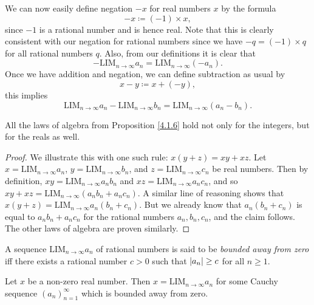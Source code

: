 \begin{note}
We can now easily define negation \(-x\) for real numbers \(x\) by the formula
\[
    -x \coloneqq (-1) \times x,
\]
since \(-1\) is a rational number and is hence real.
Note that this is clearly consistent with our negation for rational numbers since we have \(-q = (-1) \times q\) for all rational numbers \(q\).
Also, from our definitions it is clear that
\[
    -\text{LIM}_{n \to \infty} a_n = \text{LIM}_{n \to \infty} (-a_n).
\]
Once we have addition and negation, we can define subtraction as usual by
\[
    x - y \coloneqq x + (-y),
\]
this implies
\[
    \text{LIM}_{n \to \infty} a_n - \text{LIM}_{n \to \infty} b_n = \text{LIM}_{n \to \infty} (a_n - b_n).
\]
\end{note}

\begin{proposition}\label{5.3.11}
All the laws of algebra from Proposition \ref{4.1.6} hold not only for the integers, but for the reals as well.
\end{proposition}

\begin{proof}
We illustrate this with one such rule: \(x(y + z) = xy + xz\).
Let \(x = \text{LIM}_{n \to \infty} a_n\), \(y = \text{LIM}_{n \to \infty} b_n\), and \(z = \text{LIM}_{n \to \infty} c_n\) be real numbers.
Then by definition, \(xy = \text{LIM}_{n \to \infty} a_n b_n\) and \(xz = \text{LIM}_{n \to \infty} a_n c_n\), and so \(xy + xz = \text{LIM}_{n \to \infty} (a_n b_n + a_n c_n)\).
A similar line of reasoning shows that \(x(y + z) = \text{LIM}_{n \to \infty} a_n (b_n + c_n)\).
But we already know that \(a_n (b_n + c_n)\) is equal to \(a_n b_n + a_n c_n\) for the rational numbers \(a_n, b_n, c_n\), and the claim follows.
The other laws of algebra are proven similarly.
\end{proof}

\begin{definition}\label{5.3.12}
A sequence \(\text{LIM}_{n \to \infty} a_n\) of rational numbers is said to be \emph{bounded away from zero} iff there exists a rational number \(c > 0\) such that \(\abs*{a_n} \geq c\) for all \(n \geq 1\).
\end{definition}

\setcounter{theorem}{13}
\begin{lemma}\label{5.3.14}
Let \(x\) be a non-zero real number.
Then \(x = \text{LIM}_{n \to \infty} a_n\) for some Cauchy sequence \((a_n)_{n = 1}^{\infty}\) which is bounded away from zero.
\end{lemma}

